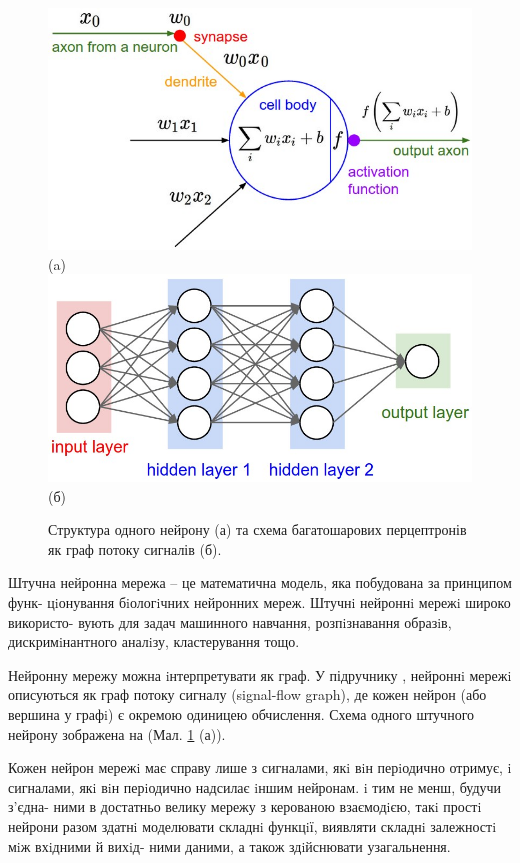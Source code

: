 \begin{figure}[b!]
	\centering	
	\includegraphics[width=0.90\linewidth]{Figures/Chapter4/neuron_model.jpeg}\\
	(a)
	\endminipage\hfill
	\centering	
	\includegraphics[width=0.90\linewidth]{Figures/Chapter4/neural_net2.jpeg}\\
	(б)
	\endminipage\hfill
	
	\caption{Структура одного нейрону (а) та схема багатошарових перцептронів як граф потоку сигналів (б).}
	\label{fig:neuralnet}
\end{figure}

Штучна нейронна мережа -- це математична модель, яка побудована за принципом функ- цiонування бiологiчних нейронних мереж. Штучнi нейроннi мережi широко використо- вують для задач машинного навчання, розпiзнавання образiв, дискримiнантного аналiзу, кластерування тощо. 

Нейронну мережу можна iнтерпретувати як граф. У підручнику \citep{book:haykin}, нейроннi мережi описуються як граф потоку сигналу (signal-flow graph), де кожен нейрон (або вершина у графi) є окремою одиницею обчислення. Схема одного штучного нейрону зображена на (Мал. \ref{fig:neuralnet} (а)).

Кожен нейрон мережi має справу лише з сигналами, якi вiн перiодично отримує, i сигналами, якi вiн перiодично надсилає iншим нейронам. i тим не менш, будучи з'єдна- ними в достатньо велику мережу з керованою взаємодiєю, такi простi нейрони разом здатнi моделювати складнi функцiї, виявляти складнi залежностi мiж вхiдними й вихiд- ними даними, а також здiйснювати узагальнення.


